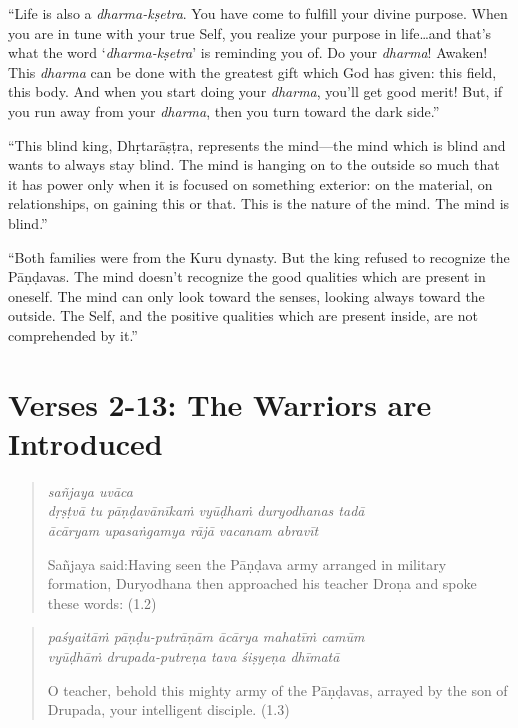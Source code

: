 \documentclass[12pt, twoside, openright]{memoir}
\begin{document}
\enquote{Life is also a \textit{dharma-kṣetra}. You have come to fulfill your divine purpose. When you are in tune with your true Self, you realize your purpose in life\ldots and that’s what the word \enquote{\textit{dharma-kṣetra}} is reminding you of. Do your \textit{dharma}! Awaken! This \textit{dharma} can be done with the greatest gift which God has given: this field, this body. And when you start doing your \textit{dharma}, you’ll get good merit! But, if you run away from your \textit{dharma}, then you turn toward the dark side.}

\enquote{This blind king, Dhṛtarāṣṭra, represents the mind---the mind which is blind and wants to always stay blind. The mind is hanging on to the outside so much that it has power only when it is focused on something exterior: on the material, on relationships, on gaining this or that. This is the nature of the mind. The mind is blind.}

\enquote{Both families were from the Kuru dynasty. But the king refused to recognize the Pāṇḍavas. The mind doesn’t recognize the good qualities which are present in oneself. The mind can only look toward the senses, looking always toward the outside. The Self, and the positive qualities which are present inside, are not comprehended by it.}

\section{Verses 2-13: The Warriors are Introduced}\label{sec-verses-2-13-the-warriors-are-introduced}



\par
\begin{verse}
\textit{sañjaya uvāca} \\
\textit{dṛṣṭvā tu pāṇḍavānīkaṁ vyūḍhaṁ duryodhanas tadā} \\
\textit{ācāryam upasaṅgamya rājā vacanam abravīt}

\noindent \quad Sañjaya said:\linebreak Having seen the Pāṇḍava army arranged in military formation, Duryodhana then approached his teacher Droṇa and spoke these words: (1.2)
\end{verse}
\par




\par
\begin{verse}
\textit{paśyaitāṁ pāṇḍu-putrāṇām ācārya mahatīṁ camūm} \\
\textit{vyūḍhāṁ drupada-putreṇa tava śiṣyeṇa dhīmatā}

\noindent O teacher, behold this mighty army of the Pāṇḍavas, arrayed by the son of Drupada, your intelligent disciple. (1.3)
\end{verse}
\par
\end{document}
